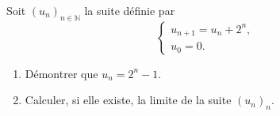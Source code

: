 
\begin{exercice}\label{exoDS2010-1-0004}

Soit $(u_n)_{n\in\mathbb{N}}$ la suite définie par 
\begin{equation}
 \left\{ \begin{array}{ll}
    u_{n+1}=u_n+2^{n},\\
    u_0=0.
  \end{array}\right.
\end{equation}
\begin{enumerate}
\item Démontrer que $\displaystyle u_n=2^n-1$.
\item Calculer, si elle existe, la limite de la suite $(u_n)_{n}$.
\end{enumerate}

\end{exercice}
